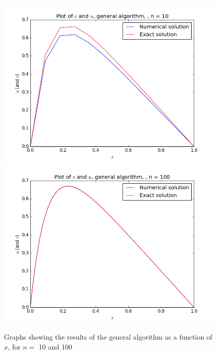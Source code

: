 \documentclass[12pt]{article}
\begin{document}
\begin{figure}[hbtp]
\centering
\includegraphics[scale=0.5]{Data_plots/General_data_n10.png}
\includegraphics[scale=0.5]{Data_plots/General_data_n100.png}
\caption{Graphs showing the results of the general algorithm as a function of $x$, for $n =$ 10 and 100}
\end{figure}
\end{document}
